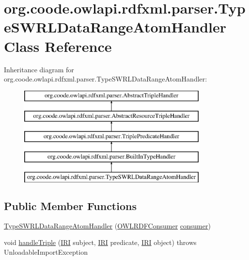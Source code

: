 \hypertarget{classorg_1_1coode_1_1owlapi_1_1rdfxml_1_1parser_1_1_type_s_w_r_l_data_range_atom_handler}{\section{org.\-coode.\-owlapi.\-rdfxml.\-parser.\-Type\-S\-W\-R\-L\-Data\-Range\-Atom\-Handler Class Reference}
\label{classorg_1_1coode_1_1owlapi_1_1rdfxml_1_1parser_1_1_type_s_w_r_l_data_range_atom_handler}
}
Inheritance diagram for org.\-coode.\-owlapi.\-rdfxml.\-parser.\-Type\-S\-W\-R\-L\-Data\-Range\-Atom\-Handler\-:\begin{figure}[H]
\begin{center}
\leavevmode
\includegraphics[height=5.000000cm]{classorg_1_1coode_1_1owlapi_1_1rdfxml_1_1parser_1_1_type_s_w_r_l_data_range_atom_handler}
\end{center}
\end{figure}
\subsection*{Public Member Functions}
\begin{DoxyCompactItemize}
\item 
\hyperlink{classorg_1_1coode_1_1owlapi_1_1rdfxml_1_1parser_1_1_type_s_w_r_l_data_range_atom_handler_ac8051acd34b3a3deae50f8f910f4eedd}{Type\-S\-W\-R\-L\-Data\-Range\-Atom\-Handler} (\hyperlink{classorg_1_1coode_1_1owlapi_1_1rdfxml_1_1parser_1_1_o_w_l_r_d_f_consumer}{O\-W\-L\-R\-D\-F\-Consumer} \hyperlink{classorg_1_1coode_1_1owlapi_1_1rdfxml_1_1parser_1_1_abstract_triple_handler_a4ccf4d898ff01eb1cadfa04b23d54e9c}{consumer})
\item 
void \hyperlink{classorg_1_1coode_1_1owlapi_1_1rdfxml_1_1parser_1_1_type_s_w_r_l_data_range_atom_handler_affb04a7a6bcc91170cc7e7715f713431}{handle\-Triple} (\hyperlink{classorg_1_1semanticweb_1_1owlapi_1_1model_1_1_i_r_i}{I\-R\-I} subject, \hyperlink{classorg_1_1semanticweb_1_1owlapi_1_1model_1_1_i_r_i}{I\-R\-I} predicate, \hyperlink{classorg_1_1semanticweb_1_1owlapi_1_1model_1_1_i_r_i}{I\-R\-I} object)  throws Unloadable\-Import\-Exception 
\end{DoxyCompactItemize}

